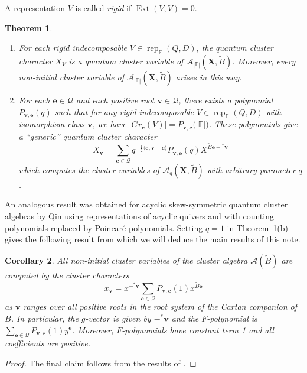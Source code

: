 \documentclass{amsart}
\newtheorem{theorem}{Theorem}
\newtheorem{corollary}[theorem]{Corollary}
\newcommand{\bfe}{\mathbf{e}}
\newcommand{\bfv}{\mathbf{v}}
\newcommand{\bfX}{\mathbf{X}}
\newcommand{\cA}{\mathcal{A}}
\newcommand{\cQ}{\mathcal{Q}}
\newcommand{\FF}{\mathbb{F}}
\newcommand{\Ext}{\operatorname{Ext}}
\newcommand{\half}{{\frac{1}{2}}}
\newcommand{\rep}{\operatorname{rep}}
\newenvironment{enumeratea}{\begin{enumerate}[\upshape (a)]}{\end{enumerate}}
\begin{document}
  A representation $V$ is called \emph{rigid} if $\Ext(V,V)=0$.  
  \begin{theorem}\cite{rupel2}\label{th:quantum cluster characters}\mbox{}
    \begin{enumeratea}
      \item For each rigid indecomposable $V\in\rep_\FF(Q,D)$, the quantum cluster character $X_V$ is a quantum cluster variable of $\cA_{|\FF|}(\bfX,\tilde B)$.  
      Moreover, every non-initial cluster variable of $\cA_{|\FF|}(\bfX,\tilde B)$ arises in this way.
      \item For each $\bfe\in\cQ$ and each positive root $\bfv\in\cQ$, there exists a polynomial $P_{\bfv,\bfe}(q)$ such that for any rigid indecomposable $V\in\rep_\FF(Q,D)$ with isomorphism class $\bfv$, we have $\big|\!Gr_\bfe(V)\big|=P_{\bfv,\bfe}\big(|\FF|\big)$.  These polynomials give a ``generic'' quantum cluster character 
      \[X_\bfv=\sum\limits_{\bfe\in\cQ} q^{-\half\langle\bfe,\bfv-\bfe\rangle}P_{\bfv,\bfe}(q)X^{\tilde B\bfe-{}^*\bfv}\]
      which computes the cluster variables of $\cA_q(\bfX,\tilde B)$ with arbitrary parameter $q$.
    \end{enumeratea}
  \end{theorem}
  An analogous result was obtained for acyclic skew-symmetric quantum cluster algebras by Qin \cite{qin} using representations of acyclic quivers and with counting polynomials replaced by Poincar\'e polynomials.  Setting $q=1$ in Theorem~\ref{th:quantum cluster characters}(b) gives the following result from which we will deduce the main results of this note.
  \begin{corollary}\label{cor:classical cluster characters}
    All non-initial cluster variables of the cluster algebra $\cA(\tilde B)$ are computed by the cluster characters
    \[x_\bfv=x^{-{}^*\bfv}\sum\limits_{\bfe\in\cQ} P_{\bfv,\bfe}(1)x^{\tilde B\bfe}\]
    as $\bfv$ ranges over all positive roots in the root system of the Cartan companion of $B$.
    In particular, the $g$-vector is given by $-{}^*\bfv$ and the $F$-polynomial is $\sum\limits_{\bfe\in\cQ} P_{\bfv,\bfe}(1)y^\bfe$.
    Moreover, $F$-polynomials have constant term 1 and all coefficients are positive.
  \end{corollary}
  \begin{proof}
    The final claim follows from the results of \cite{wolf}.
  \end{proof}
\end{document}
